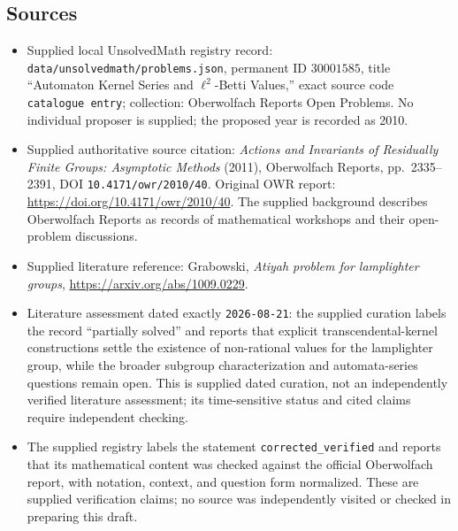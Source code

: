 \documentclass[11pt]{article}
\begin{document}
\subsection{Sources}
\begin{itemize}
\item Supplied local UnsolvedMath registry record: \texttt{data/unsolvedmath/problems.json}, permanent ID \(30001585\), title ``Automaton Kernel Series and \(\ell^2\)-Betti Values,'' exact source code \texttt{catalogue entry}; collection: Oberwolfach Reports Open Problems. No individual proposer is supplied; the proposed year is recorded as 2010.
\item Supplied authoritative source citation: \emph{Actions and Invariants of Residually Finite Groups: Asymptotic Methods} (2011), Oberwolfach Reports, pp.\ 2335--2391, DOI \texttt{10.4171/owr/2010/40}. Original OWR report: \url{https://doi.org/10.4171/owr/2010/40}. The supplied background describes Oberwolfach Reports as records of mathematical workshops and their open-problem discussions.
\item Supplied literature reference: Grabowski, \emph{Atiyah problem for lamplighter groups}, \url{https://arxiv.org/abs/1009.0229}.
\item Literature assessment dated exactly \texttt{2026-08-21}: the supplied curation labels the record ``partially solved'' and reports that explicit transcendental-kernel constructions settle the existence of non-rational values for the lamplighter group, while the broader subgroup characterization and automata-series questions remain open. This is supplied dated curation, not an independently verified literature assessment; its time-sensitive status and cited claims require independent checking.
\item The supplied registry labels the statement \texttt{corrected\_verified} and reports that its mathematical content was checked against the official Oberwolfach report, with notation, context, and question form normalized. These are supplied verification claims; no source was independently visited or checked in preparing this draft.
\end{itemize}
\end{document}
